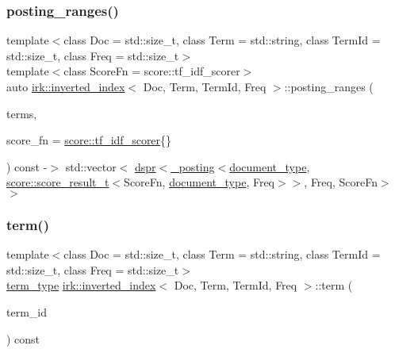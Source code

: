 \subsubsection{\texorpdfstring{posting\+\_\+ranges()}{posting\_ranges()}}
{\footnotesize\ttfamily template$<$class Doc  = std\+::size\+\_\+t, class Term  = std\+::string, class Term\+Id  = std\+::size\+\_\+t, class Freq  = std\+::size\+\_\+t$>$ \\
template$<$class Score\+Fn  = score\+::tf\+\_\+idf\+\_\+scorer$>$ \\
auto \mbox{\hyperlink{classirk_1_1inverted__index}{irk\+::inverted\+\_\+index}}$<$ Doc, Term, Term\+Id, Freq $>$\+::posting\+\_\+ranges (\begin{DoxyParamCaption}\item[{const std\+::vector$<$ std\+::string $>$ \&}]{terms,  }\item[{Score\+Fn}]{score\+\_\+fn = {\ttfamily \mbox{\hyperlink{structirk_1_1score_1_1tf__idf__scorer}{score\+::tf\+\_\+idf\+\_\+scorer}}\{\}} }\end{DoxyParamCaption}) const -\/$>$ std\+::vector$<$
            \mbox{\hyperlink{namespaceirk_af92c7aae439f59ccae252f027f851c24}{dspr}}$<$\mbox{\hyperlink{structirk_1_1__posting}{\+\_\+posting}}$<$\mbox{\hyperlink{classirk_1_1inverted__index_ab708a9d1605de705341f3ed81bd7d5e7}{document\+\_\+type}}, \mbox{\hyperlink{namespaceirk_1_1score_af4a2c84b3548a4ac12aac3862bc94875}{score\+::score\+\_\+result\+\_\+t}}$<$Score\+Fn, \mbox{\hyperlink{classirk_1_1inverted__index_ab708a9d1605de705341f3ed81bd7d5e7}{document\+\_\+type}}, Freq$>$$>$,
                Freq,
                Score\+Fn$>$$>$
    \hspace{0.3cm}{\ttfamily [inline]}}

\mbox{\label{classirk_1_1inverted__index_af6d217382bf3bed6b19a009cb0274148}} 
\subsubsection{\texorpdfstring{term()}{term()}}
{\footnotesize\ttfamily template$<$class Doc  = std\+::size\+\_\+t, class Term  = std\+::string, class Term\+Id  = std\+::size\+\_\+t, class Freq  = std\+::size\+\_\+t$>$ \\
\mbox{\hyperlink{classirk_1_1inverted__index_a7a60c2cec1774c08f21e8e27ccb5ac33}{term\+\_\+type}} \mbox{\hyperlink{classirk_1_1inverted__index}{irk\+::inverted\+\_\+index}}$<$ Doc, Term, Term\+Id, Freq $>$\+::term (\begin{DoxyParamCaption}\item[{\mbox{\hyperlink{classirk_1_1inverted__index_aac7579f5261c795a6f19a7f700b57b2b}{term\+\_\+id\+\_\+type}}}]{term\+\_\+id }\end{DoxyParamCaption}) const\hspace{0.3cm}{\ttfamily [inline]}}

